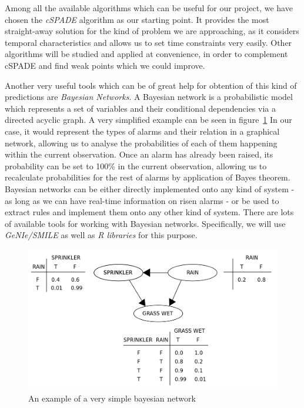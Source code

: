 \documentclass[a4paper,12pt]{article}
\begin{document}
Among all the available algorithms which can be useful for our project, we have chosen the \emph{cSPADE} algorithm as our starting point. It provides the most straight-away solution for the kind of problem we are approaching, as it considers temporal characteristics and allows us to set time constraints very easily. Other algorithms will be studied and applied at convenience, in order to complement cSPADE and find weak points which we could improve.

Another very useful tools which can be of great help for obtention of this kind of predictions are \emph{Bayesian Networks}\cite{Jensen2009}. A Bayesian network is a probabilistic model which represents a set of variables and their conditional dependencies via a directed acyclic graph. A very simplified example can be seen in figure~\ref{fig:bayesian_example} In our case, it would represent the types of alarms and their relation in a graphical network, allowing us to analyse the probabilities of each of them happening within the current observation. Once an alarm has already been raised, its probability can be set to 100\% in the current observation, allowing us to recalculate probabilities for the rest of alarms by application of Bayes theorem. Bayesian networks can be either directly implemented onto any kind of system - as long as we can have real-time information on risen alarms - or be used to extract rules and implement them onto any other kind of system. There are lots of available tools for working with Bayesian networks. Specifically, we will use \emph{GeNIe/SMILE} as well as \emph{R libraries} for this purpose.

\begin{figure}[hbtp]
\includegraphics[width=\textwidth]{img/bayesian_example.png}
\caption{An example of a very simple bayesian network} \label{fig:bayesian_example}
\end{figure}
\end{document}
